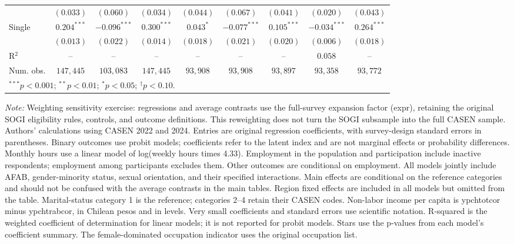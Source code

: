\begin{table}[htpb]
{\begin{tabular}{l c c c c c c c c}
 & $(0.033)$ & $(0.060)$ & $(0.034)$ & $(0.044)$ & $(0.067)$ & $(0.041)$ & $(0.020)$ & $(0.043)$ \\
Single & $0.204^{***}$ & $-0.096^{***}$ & $0.300^{***}$ & $0.043^{*}$ & $-0.077^{***}$ & $0.105^{***}$ & $-0.034^{***}$ & $0.264^{***}$ \\
 & $(0.013)$ & $(0.022)$ & $(0.014)$ & $(0.018)$ & $(0.021)$ & $(0.020)$ & $(0.006)$ & $(0.018)$ \\
\hline
R$^2$ & -- & -- & -- & -- & -- & -- & $0.058$ & -- \\
Num. obs. & $147,445$ & $103,083$ & $147,445$ & $93,908$ & $93,908$ & $93,897$ & $93,358$ & $93,772$ \\
\hline
\multicolumn{9}{l}{\scriptsize $^{***}p<0.001$; $^{**}p<0.01$; $^{*}p<0.05$; $^{\dagger}p<0.10$.} \\
\end{tabular}%
}
\par\smallskip
\begin{minipage}{\textwidth}\footnotesize\raggedright
\textit{Note:} Weighting sensitivity exercise: regressions and average contrasts use the full-survey expansion factor (expr), retaining the original SOGI eligibility rules, controls, and outcome definitions. This reweighting does not turn the SOGI subsample into the full CASEN sample. Authors' calculations using CASEN 2022 and 2024. Entries are original regression coefficients, with survey-design standard errors in parentheses. Binary outcomes use probit models; coefficients refer to the latent index and are not marginal effects or probability differences. Monthly hours use a linear model of log(weekly hours times 4.33). Employment in the population and participation include inactive respondents; employment among participants excludes them. Other outcomes are conditional on employment. All models jointly include AFAB, gender-minority status, sexual orientation, and their specified interactions. Main effects are conditional on the reference categories and should not be confused with the average contrasts in the main tables. Region fixed effects are included in all models but omitted from the table. Marital-status category 1 is the reference; categories 2--4 retain their CASEN codes. Non-labor income per capita is ypchtotcor minus ypchtrabcor, in Chilean pesos and in levels. Very small coefficients and standard errors use scientific notation. R-squared is the weighted coefficient of determination for linear models; it is not reported for probit models. Stars use the p-values from each model's coefficient summary. The female-dominated occupation indicator uses the original occupation list.
\end{minipage}
\end{table}

